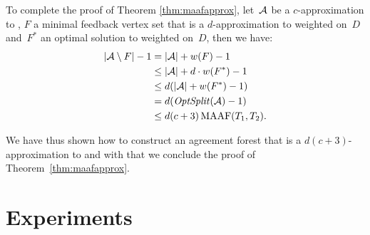 To complete the proof of Theorem \ref{thm:maafapprox}, let~${\mathcal A}$ be a $c$-approximation to \maf, $F$ a minimal feedback vertex set that is a $d$-approximation to weighted \dfvs on~$D$ and~$F^*$ an optimal  solution to weighted \dfvs on~$D$, then we have:
\begin{align*}
 |{\mathcal A}\setminus F| - 1 & = |{\mathcal A}| + w(F) - 1\\
				&\leq |{\mathcal A}| + d\cdot w(F^*) - 1\\
  				&\leq d(|{\mathcal A}| + w(F^*) - 1)\\
 				&= d(\mathit{OptSplit}({\mathcal A})-1) \\
 				&\leq d(c+3)\operatorname{MAAF}(T_1,T_2).
\end{align*}

We have thus shown how to construct an agreement forest that is a $d(c+3)$-approximation to \maaf and with that we conclude the proof of Theorem~\ref{thm:maafapprox}.




\section{Experiments} \label{sec:nonbinexp}





